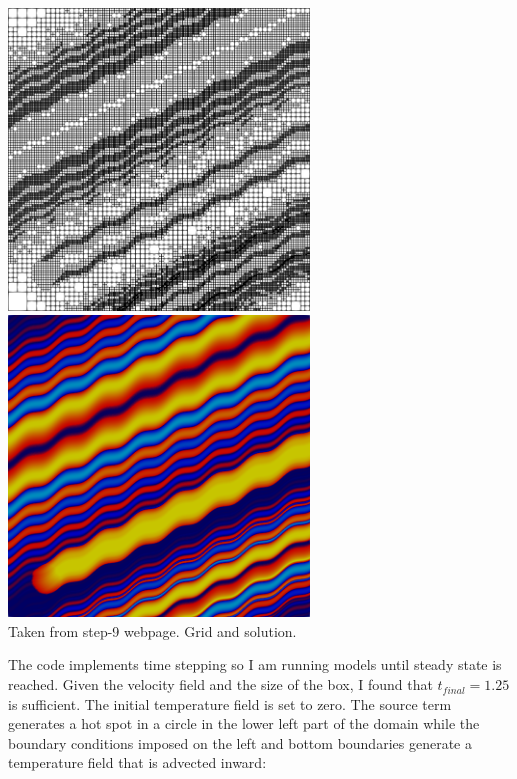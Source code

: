 \begin{center}
\includegraphics[width=8cm]{python_codes/fieldstone_43/images/step-9-grid-9.png}
\includegraphics[width=8cm]{python_codes/fieldstone_43/images/step-9-solution-9.png}\\
{\captionfont Taken from step-9 webpage. Grid and solution.}
\end{center}

The code implements time stepping so I am running models until steady state is reached. 
Given the velocity field and the size of the box, I found that $t_{final}=1.25$ is sufficient.
The initial temperature field is set to zero. The source term generates a hot spot in a circle 
in the lower left part of the domain while the boundary conditions imposed on the left and bottom 
boundaries generate a temperature field that is advected inward:

